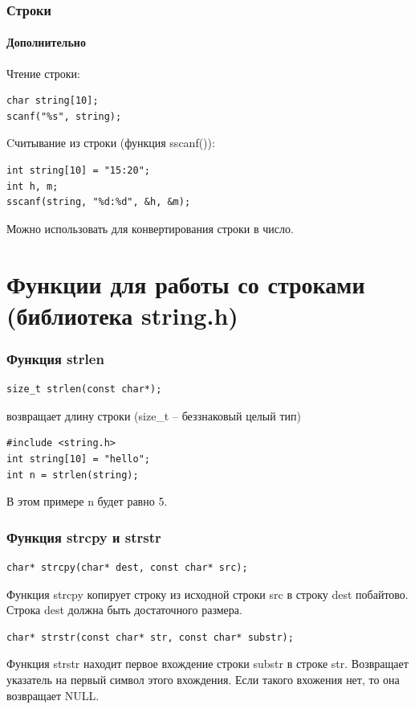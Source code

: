 \documentclass[12pt,pdf,hyperref={unicode}]{beamer}
\begin{document}
\begin{frame}[fragile]
\frametitle{Строки} 
\framesubtitle{Дополнительно}
Чтение строки:
\begin{lstlisting}
char string[10];
scanf("%s", string);
\end{lstlisting}
Cчитывание из строки (функция sscanf()):
\begin{lstlisting}
int string[10] = "15:20";
int h, m;
sscanf(string, "%d:%d", &h, &m);
\end{lstlisting}
Можно использовать для конвертирования строки в число.
\end{frame}

\section{Функции для работы со строками (библиотека string.h)}

\begin{frame}[fragile]
\frametitle{Функция strlen} 
\begin{lstlisting}
size_t strlen(const char*);
\end{lstlisting}
возвращает длину строки (size\_t -- беззнаковый целый тип)
\begin{lstlisting}
#include <string.h>
int string[10] = "hello";
int n = strlen(string);
\end{lstlisting}
В этом примере n будет равно 5.
\end{frame}


\begin{frame}[fragile]
\frametitle{Функция strcpy и strstr} 
\begin{lstlisting}
char* strcpy(char* dest, const char* src);
\end{lstlisting}
Функция strcpy копирует строку из исходной строки src в строку dest побайтово. Строка dest должна быть достаточного размера.

\begin{lstlisting}
char* strstr(const char* str, const char* substr);
\end{lstlisting}
Функция strstr находит первое вхождение строки substr в строке str. Возвращает указатель на первый символ этого вхождения. Если такого вхожения нет, то она возвращает NULL.
\end{frame}
\end{document}
